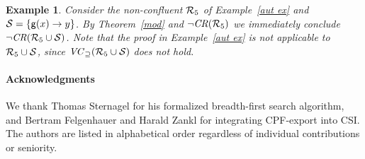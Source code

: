 \documentclass[a4paper]{easychair}
\newtheorem{example}[theorem]{Example}
\newcommand\CSI{\textsf{CSI}\xspace}
\newcommand\RR{{\cal R}}
\newcommand\SSS{{\cal S}}
\newcommand\CR{\mathit{CR}}
\newcommand\nCR{\neg \CR}
\newcommand\m[1]{\mathsf{#1}}
\newcommand\rTH[1]{Theorem~\ref{#1}}
\newcommand\rEX[1]{Example~\ref{#1}}
\newcommand{\vcsubset}[1]{\mathit{VC}_{\supseteq}(#1)}
\begin{document}
\begin{example}
Consider the non-confluent $\RR_5$ of \rEX{aut ex} and $\SSS = \{\m g(x) \to y\}$.
By \rTH{mod} and $\nCR(\RR_5)$ we immediately conclude $\nCR(\RR_5 \cup \SSS)$.
Note that the proof in \rEX{aut ex} is not applicable to $\RR_5 \cup \SSS$, since
$\vcsubset{\RR_5 \cup \SSS}$ does not hold.
\end{example}

\paragraph{Acknowledgments}
We thank Thomas Sternagel for his formalized breadth-first search algorithm,
and Bertram Felgenhauer and Harald Zankl for integrating 
CPF-export into \CSI. The authors are listed in alphabetical order regardless of individual
contributions or seniority.



\end{document}

